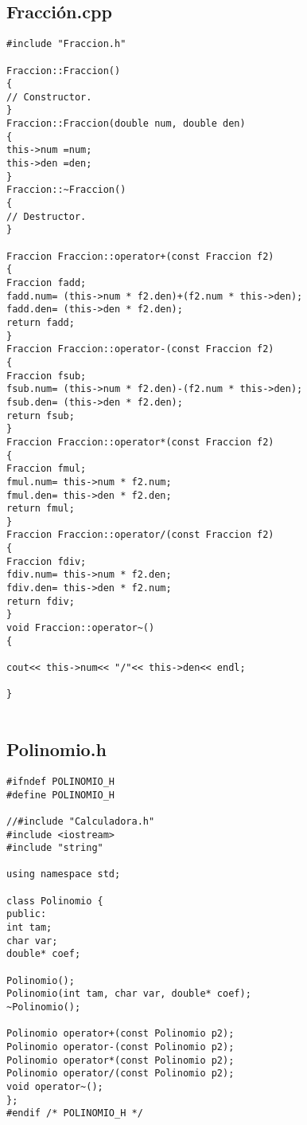 \documentclass[11pt]{article}
\begin{document}
\subsection{Fracción.cpp}
\begin{lstlisting}
#include "Fraccion.h"

Fraccion::Fraccion() 
{	
// Constructor.
}
Fraccion::Fraccion(double num, double den) 
{
this->num =num;
this->den =den;
}
Fraccion::~Fraccion() 
{	
// Destructor.
}

Fraccion Fraccion::operator+(const Fraccion f2) 
{
Fraccion fadd;
fadd.num= (this->num * f2.den)+(f2.num * this->den);
fadd.den= (this->den * f2.den);
return fadd;
}
Fraccion Fraccion::operator-(const Fraccion f2) 
{
Fraccion fsub;
fsub.num= (this->num * f2.den)-(f2.num * this->den);
fsub.den= (this->den * f2.den);
return fsub;
}
Fraccion Fraccion::operator*(const Fraccion f2) 
{
Fraccion fmul;
fmul.num= this->num * f2.num;
fmul.den= this->den * f2.den;
return fmul;
}
Fraccion Fraccion::operator/(const Fraccion f2) 
{
Fraccion fdiv;
fdiv.num= this->num * f2.den;
fdiv.den= this->den * f2.num;
return fdiv;
}
void Fraccion::operator~() 
{

cout<< this->num<< "/"<< this->den<< endl;

}


\end{lstlisting}

\subsection{Polinomio.h}
\begin{lstlisting}
#ifndef POLINOMIO_H
#define POLINOMIO_H

//#include "Calculadora.h"
#include <iostream>
#include "string"

using namespace std;

class Polinomio {
public:	
int tam;	
char var;	
double* coef;

Polinomio();
Polinomio(int tam, char var, double* coef);
~Polinomio();

Polinomio operator+(const Polinomio p2);
Polinomio operator-(const Polinomio p2);
Polinomio operator*(const Polinomio p2);
Polinomio operator/(const Polinomio p2);
void operator~();
};
#endif /* POLINOMIO_H */

\end{lstlisting}
\end{document}
